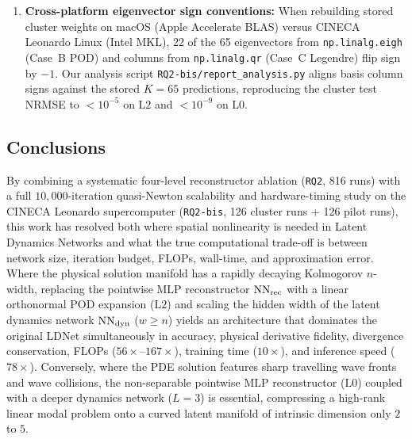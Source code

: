 \begin{enumerate}[leftmargin=2em]
  \item \textbf{Cross-platform eigenvector sign conventions:} When rebuilding stored cluster weights on macOS (Apple Accelerate BLAS) versus CINECA Leonardo Linux (Intel MKL), 22 of the 65 eigenvectors from \texttt{np.linalg.eigh} (Case~B POD) and columns from \texttt{np.linalg.qr} (Case~C Legendre) flip sign by $-1$. Our analysis script \texttt{RQ2-bis/report\_analysis.py} aligns basis column signs against the stored $K=65$ predictions, reproducing the cluster test NRMSE to $< 10^{-5}$ on $\mathrm{L2}$ and $< 10^{-9}$ on $\mathrm{L0}$.
\end{enumerate}

\subsection{Conclusions}

By combining a systematic four-level reconstructor ablation (\texttt{RQ2}, 816 runs) with a full $10{,}000$-iteration quasi-Newton scalability and hardware-timing study on the CINECA Leonardo supercomputer (\texttt{RQ2-bis}, 126 cluster runs + 126 pilot runs), this work has resolved both where spatial nonlinearity is needed in Latent Dynamics Networks and what the true computational trade-off is between network size, iteration budget, FLOPs, wall-time, and approximation error. Where the physical solution manifold has a rapidly decaying Kolmogorov $n$-width, replacing the pointwise MLP reconstructor $\mathrm{NN}_{\mathrm{rec}}$ with a linear orthonormal POD expansion ($\mathrm{L2}$) and scaling the hidden width of the latent dynamics network $\mathrm{NN}_{\mathrm{dyn}}$ ($w \ge n$) yields an architecture that dominates the original LDNet simultaneously in accuracy, physical derivative fidelity, divergence conservation, FLOPs ($56\times$--$167\times$), training time ($10\times$), and inference speed ($78\times$). Conversely, where the PDE solution features sharp travelling wave fronts and wave collisions, the non-separable pointwise MLP reconstructor ($\mathrm{L0}$) coupled with a deeper dynamics network ($L=3$) is essential, compressing a high-rank linear modal problem onto a curved latent manifold of intrinsic dimension only $2$ to $5$.
